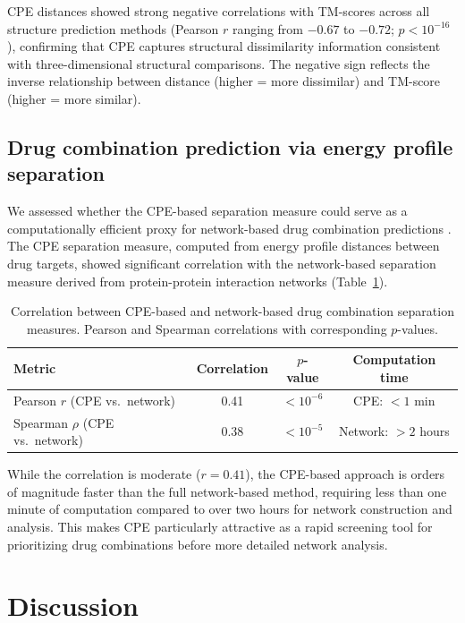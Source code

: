 \documentclass[11pt]{article}
\begin{document}
CPE distances showed strong negative correlations with TM-scores across all structure prediction methods (Pearson $r$ ranging from $-0.67$ to $-0.72$; $p < 10^{-16}$), confirming that CPE captures structural dissimilarity information consistent with three-dimensional structural comparisons. The negative sign reflects the inverse relationship between distance (higher = more dissimilar) and TM-score (higher = more similar).

\subsection{Drug combination prediction via energy profile separation}

We assessed whether the CPE-based separation measure could serve as a computationally efficient proxy for network-based drug combination predictions \citep{cheng2019}. The CPE separation measure, computed from energy profile distances between drug targets, showed significant correlation with the network-based separation measure derived from protein-protein interaction networks (Table~\ref{tab:drug}).

\begin{table}[H]
\centering
\caption{Correlation between CPE-based and network-based drug combination separation measures. Pearson and Spearman correlations with corresponding $p$-values.}
\label{tab:drug}
\begin{tabular}{lccc}
\toprule
\textbf{Metric} & \textbf{Correlation} & \textbf{$p$-value} & \textbf{Computation time} \\
\midrule
Pearson $r$ (CPE vs.\ network) & 0.41 & $< 10^{-6}$ & CPE: $< 1$ min \\
Spearman $\rho$ (CPE vs.\ network) & 0.38 & $< 10^{-5}$ & Network: $> 2$ hours \\
\bottomrule
\end{tabular}
\end{table}

While the correlation is moderate ($r = 0.41$), the CPE-based approach is orders of magnitude faster than the full network-based method, requiring less than one minute of computation compared to over two hours for network construction and analysis. This makes CPE particularly attractive as a rapid screening tool for prioritizing drug combinations before more detailed network analysis.

\section{Discussion}
\end{document}
